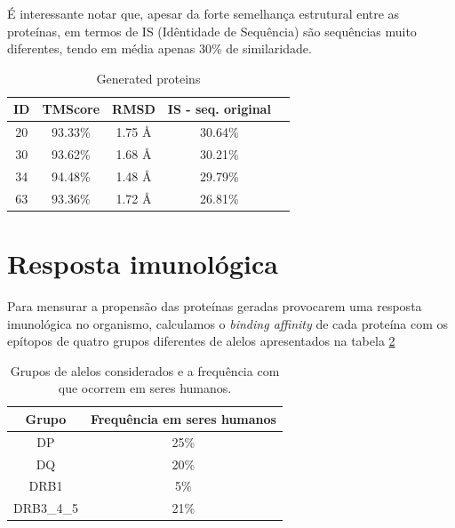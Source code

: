 É interessante notar que, apesar da forte semelhança estrutural entre as proteínas,
em termos de IS (Idêntidade de Sequência)
são sequências muito diferentes, tendo em média apenas 30\% de similaridade. 
  
\begin{table}[htbp]
    \centering
    \begin{tabular}{c|cccc}
        \hline
        \textbf{ID} & \textbf{TMScore} & \textbf{RMSD} & \textbf{IS - seq. original} \\
        \hline
         20 & 93.33\% & 1.75 Å & 30.64\% \\
         30 & 93.62\% & 1.68 Å & 30.21\% \\
         34 & 94.48\% & 1.48 Å & 29.79\% \\
         63 & 93.36\% & 1.72 Å & 26.81\% \\
        \hline
    \end{tabular}
    \caption{Generated proteins}
    \label{tab:tabela_exemplo}
\end{table}



\section{Resposta imunológica}
\label{section:imuno_resultados}
Para mensurar a propensão das proteínas geradas provocarem uma resposta imunológica no organismo, 
calculamos o \textit{binding affinity} de cada proteína com os epítopos de quatro grupos diferentes 
de alelos apresentados na tabela \ref{tab:alelo_grupos}


    \begin{table}[]
        \begin{tabular}{|c|c|}
        \hline
        \rowcolor[HTML]{C0C0C0} 
        {\color[HTML]{343434} Grupo} & {\color[HTML]{343434} Frequência em seres humanos} \\ \hline
        DP                                                                         & 25\%                                                                           \\ \hline
        DQ                                                                         & 20\%                                                                           \\ \hline
        DRB1                                                                       & 5\%                                                                            \\ \hline
        DRB3\_4\_5                                                                 & 21\%                                                                           \\ \hline
        \end{tabular}
        \caption{Grupos de alelos considerados e a frequência com que ocorrem em seres humanos.}
        \label{tab:alelo_grupos}
        \end{table}


